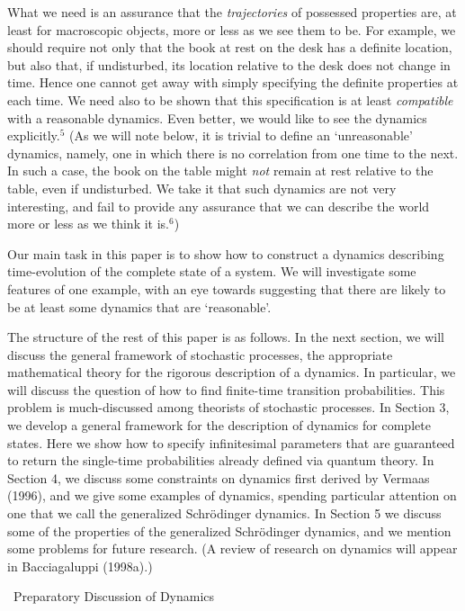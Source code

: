 \documentclass[12pt]{article}
\renewcommand{\section}[1]{\addtocounter{section}{1}
                           \setcounter{subsection}{0}
                           \setcounter{subsubsection}{0}
                           \vspace{20pt}
                           \begin{center}
                           {\large \thesection \ #1}
                           \end{center}
                           \vspace{20pt}}
\begin{document}
What we need is an assurance that the {\it trajectories} of possessed 
properties are, at least for macroscopic objects, more or less as we 
see them to be.  For example, we should require not only that the book 
at rest on the desk has a definite location, but also that, if 
undisturbed, its location relative to the desk does not change in 
time.  Hence one cannot get away with simply specifying the definite 
properties at each time.  We need also to be shown that this 
specification is at least {\it compatible} with a reasonable dynamics.  
Even better, we would like to see the dynamics explicitly.$^5$ (As we 
will note below, it is trivial to define an `unreasonable' dynamics, 
namely, one in which there is no correlation from one time to the 
next.  In such a case, the book on the table might {\it not} remain at 
rest relative to the table, even if undisturbed.  We take it that such 
dynamics are not very interesting, and fail to provide any assurance 
that we can describe the world more or less as we think it is.$^6$)

Our main task in this paper is to show how to construct a dynamics 
describing time-evolution of the complete state of a system.  We will 
investigate some features of one example, with an eye towards 
suggesting that there are likely to be at least some dynamics that are 
`reasonable'.

The structure of the rest of this paper is as follows.  In the next 
section, we will discuss the general framework of stochastic 
processes, the appropriate mathematical theory for the rigorous 
description of a dynamics.  In particular, we will discuss the 
question of how to find finite-time transition probabilities.  This 
problem is much-discussed among theorists of stochastic processes.  In 
Section 3, we develop a general framework for the description of 
dynamics for complete states.  Here we show how to specify 
infinitesimal parameters that are guaranteed to return the single-time 
probabilities already defined via quantum theory.  In Section 4, we 
discuss some constraints on dynamics first derived by Vermaas (1996), 
and we give some examples of dynamics, spending particular attention 
on one that we call the generalized Schr\"odinger dynamics.  In 
Section 5 we discuss some of the properties of the generalized 
Schr\"odinger dynamics, and we mention some problems for future 
research.  (A review of research on dynamics will appear in 
Bacciagaluppi (1998a).)


\section{Preparatory Discussion of Dynamics}
\end{document}
